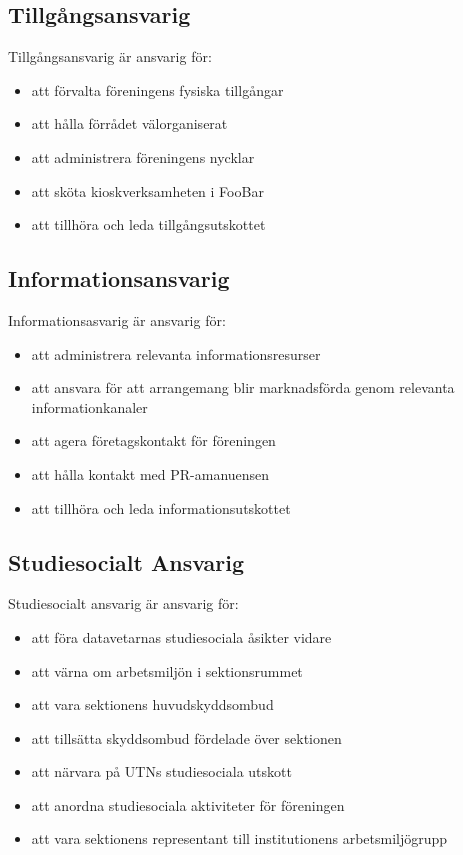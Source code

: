 \documentclass[a4paper]{article}
\begin{document}
{  \subsection{Tillgångsansvarig}
  Tillgångsansvarig är ansvarig för:
  \begin{itemize}
    \item att förvalta föreningens fysiska tillgångar
    \item att hålla förrådet välorganiserat
    \item att administrera föreningens nycklar
    \item att sköta kioskverksamheten i FooBar
    \item att tillhöra och leda tillgångsutskottet
  \end{itemize}
  
  \subsection{Informationsansvarig}
  Informationsasvarig är ansvarig för:
  \begin{itemize}
    \item att administrera relevanta informationsresurser
    \item att ansvara för att arrangemang blir marknadsförda genom relevanta informationkanaler
    \item att agera företagskontakt för föreningen
    \item att hålla kontakt med PR-amanuensen
    \item att tillhöra och leda informationsutskottet
  \end{itemize}}

\subsection{Studiesocialt Ansvarig}
Studiesocialt ansvarig är ansvarig för:
\begin{itemize}
  \item att föra datavetarnas studiesociala åsikter vidare
  \item att värna om arbetsmiljön i sektionsrummet
  \item att vara sektionens huvudskyddsombud
  \item att tillsätta skyddsombud fördelade över sektionen
  \item att närvara på UTNs studiesociala utskott
  \item att anordna studiesociala aktiviteter för föreningen
  \item att vara sektionens representant till institutionens arbetsmiljögrupp
\end{itemize}
\end{document}
